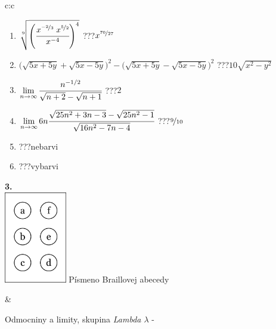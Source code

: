 \documentclass[10pt]{report}
\begin{document}
\begin{tabular}{c:c}
\begin{minipage}[c][104.5mm][t]{0.5\linewidth}
\begin{center}
\begin{minipage}{0.79\linewidth}
\begin{center}
\begin{varwidth}{\linewidth}
\begin{enumerate}
\small
\item $\sqrt[9]{\left(\cfrac{x^{\nicefrac{-2}{3}}\;x^{\nicefrac{5}{2}}}{x^{-4}}\right)^{4}}$\quad \dotfill\; ???\;\dotfill \quad $x^{\nicefrac{70}{27}}$
\item {\footnotesize{\scriptsize$\big(\sqrt{5x+5y}+\sqrt{5x-5y}\big)^2-\big(\sqrt{5x+5y}-\sqrt{5x-5y}\big)^2$}\quad \dotfill\; ???\;\dotfill \quad $10\sqrt{x^2-y^2}$}
\item $\lim\limits_{n\to\infty}\cfrac{n^{-1/2}}{\sqrt{n+2}-\sqrt{n+1}}$\quad \dotfill\; ???\;\dotfill \quad $2$
\item $\lim\limits_{n\to\infty}6n\cfrac{\sqrt{25n^2+3n-3}-\sqrt{25n^2-1}}{\sqrt{16n^2-7n-4}}$\quad \dotfill\; ???\;\dotfill \quad $\nicefrac{9}{10}$
\item \quad \dotfill\; ???\;\dotfill \quad nebarvi
\item \quad \dotfill\; ???\;\dotfill \quad vybarvi
\end{enumerate}
\end{varwidth}
\end{center}
\end{minipage}
\begin{minipage}{0.20\linewidth}
\begin{center}
{\Huge\bfseries 3.} \\[2mm]
\includegraphics[height=40mm]{../images/braille.png}
{\small Písmeno Braillovej abecedy}
\end{center}
\end{minipage}
\end{center}
\end{minipage}
&
\begin{minipage}[c][104.5mm][t]{0.5\linewidth}
\begin{center}
\vspace{7mm}
{\huge Odmocniny a limity, skupina \textit{Lambda $\lambda$} -}\\[5mm]

\end{center}
\end{minipage}
\end{tabular}
\end{document}
